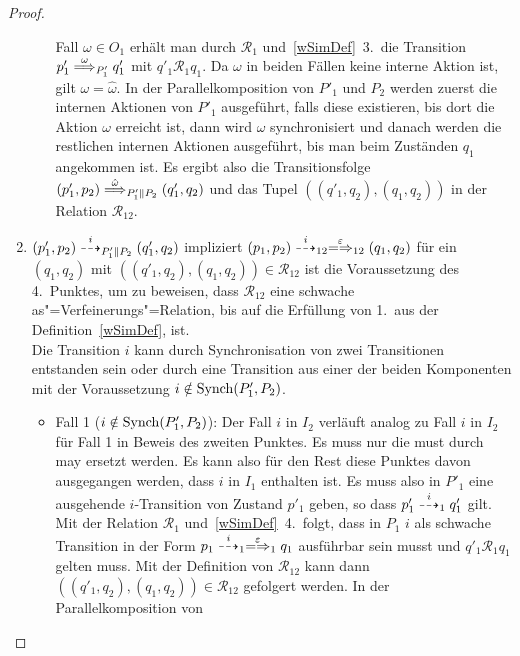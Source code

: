 \begin{proof}
\begin{enumerate}
\begin{itemize}
          Fall $\omega\in O_1$ erhält man durch $\mathcal{R}_1$
          und~\ref{wSimDef}~3.\ die Transition $p'_1 \weakmust[\omega]_{P'_1}
          q'_1$ mit $q'_1\mathcal{R}_1 q_1$. Da $\omega$ in beiden Fällen keine
          interne Aktion ist, gilt $\omega =\hat{\omega}$. In der
          Parallelkomposition von $P'_1$ und $P_2$ werden zuerst die internen
          Aktionen von $P'_1$ ausgeführt, falls diese existieren, bis dort die
          Aktion $\omega$ erreicht ist, dann wird $\omega$ synchronisiert und
          danach werden die restlichen internen Aktionen ausgeführt, bis man
          beim Zuständen $q_1$ angekommen ist. Es ergibt also die
          Transitionsfolge $(p'_1,p_2) \weakmust[\hat{\omega}]_{P'_1\|P_2}
          (q'_1,q_2)$ und das Tupel $((q'_1,q_2),(q_1,q_2))$ in der Relation
          $\mathcal{R}_{12}$.
      \end{itemize}
    \item $(p'_1,p_2)\may[i]_{P'_1\|P_2}(q'_1,q_2)$ impliziert $(p_1,p_2)
      \may[i]_{12} \weakmay[\varepsilon]_{12} (q_1,q_2)$ für ein $(q_1,q_2)$
      mit $((q'_1,q_2),(q_1,q_2))\in\mathcal{R}_{12}$ ist die Voraussetzung
      des 4.\ Punktes, um zu beweisen, dass $\mathcal{R}_{12}$ eine schwache
      as"=Verfeinerungs"=Relation, bis auf die Erfüllung von 1.\ aus der
      Definition~\ref{wSimDef}, ist.\\
      Die Transition $i$ kann durch Synchronisation von zwei
      Transitionen entstanden sein oder durch eine Transition aus einer der
      beiden Komponenten mit der Voraussetzung $i\notin\mathrm{Synch} (P'_1,P_2)$.
      \begin{itemize}
        \item Fall 1 ($i\notin\mathrm{Synch} (P'_1,P_2)$): Der Fall $i$ in $I_2$
          verläuft analog zu Fall $i$ in $I_2$ für Fall 1 in Beweis des zweiten
          Punktes. Es muss nur die must durch may ersetzt werden. Es kann also
          für den Rest diese Punktes davon ausgegangen werden, dass $i$ in
          $I_1$ enthalten ist. Es muss also in $P'_1$ eine ausgehende
          $i$-Transition von Zustand $p'_1$ geben, so dass $p'_1\may[i]_1 q'_1$
          gilt. Mit der Relation $\mathcal{R}_1$ und~\ref{wSimDef}~4.\ folgt,
          dass in $P_1$ $i$ als schwache Transition in der Form $p_1\may[i]_1
          \weakmay[\varepsilon]_1 q_1$ ausführbar sein musst und $q'_1
          \mathcal{R}_1 q_1$ gelten muss. Mit der Definition von
          $\mathcal{R}_{12}$ kann dann $((q'_1,q_2),(q_1,q_2)) \in
          \mathcal{R}_{12}$ gefolgert werden. In der Parallelkomposition von

\end{itemize}
\end{enumerate}
\end{proof}
